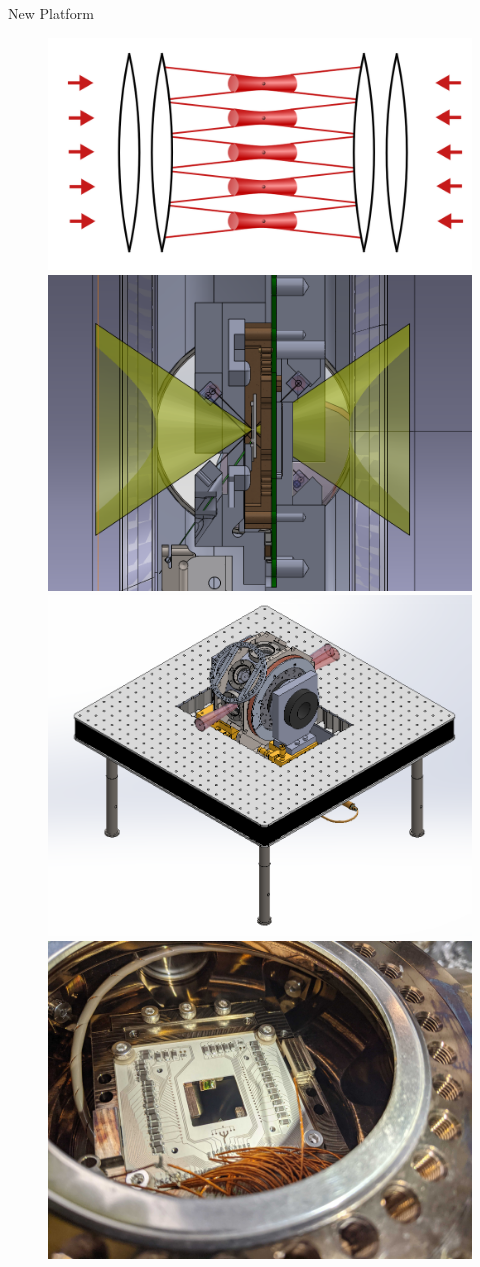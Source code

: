 \documentclass[final]{beamer}
\begin{document}
\begin{frame}{}
\begin{center}
\begin{columns}[t]
\begin{column}{0.49\textwidth}
\begin{alertblock}{New Platform}
      \begin{figure}
        \includegraphics[height=0.285\textwidth]{./figs/array_sw.png}
        \includegraphics[height=0.285\textwidth]{./figs/trap_NA.png}\\
        \includegraphics[height=0.35\textwidth]{./figs/exp_iso.png}
        \includegraphics[height=0.35\textwidth]{./figs/mirror_photo.jpg}
      \end{figure}

    \end{alertblock}

  \end{column}
\end{columns}

\end{center}
\end{frame}
\end{document}
